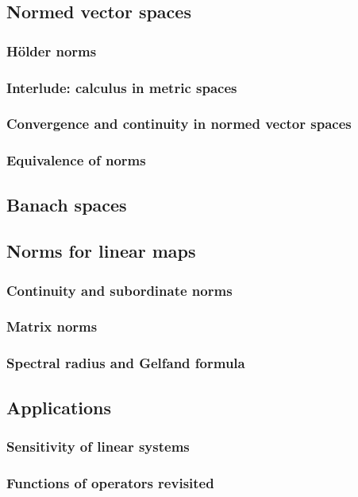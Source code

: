\documentclass[a4paper,twoside]{article}
\theoremstyle{definition}
\theoremstyle{plain}
\begin{document}
\subsection{Normed vector spaces}
\subsubsection{Hölder norms}
\subsubsection{Interlude: calculus in metric spaces}
\subsubsection{Convergence and continuity in normed vector spaces}
\subsubsection{Equivalence of norms}
\subsection{Banach spaces}
\subsection{Norms for linear maps}
\subsubsection{Continuity and subordinate norms}
\subsubsection{Matrix norms}
\subsubsection{Spectral radius and Gelfand formula}
\subsection{Applications}
\subsubsection{Sensitivity of linear systems}
\subsubsection{Functions of operators revisited}
\end{document}
